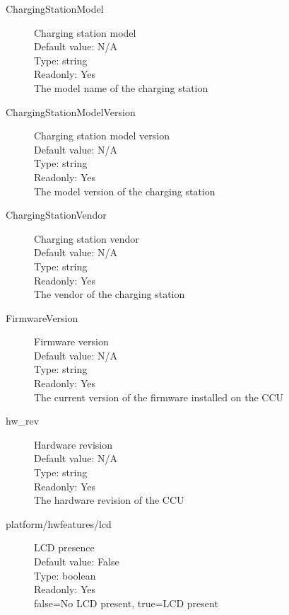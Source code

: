 \begin{description}
\item[ChargingStationModel] Charging station model\\
  Default value: N/A\\
  Type: string\\
  Readonly: Yes\\
  The model name of the charging station\\

\item[ChargingStationModelVersion] Charging station model version\\
  Default value: N/A\\
  Type: string\\
  Readonly: Yes\\
  The model version of the charging station\\

\item[ChargingStationVendor] Charging station vendor\\
  Default value: N/A\\
  Type: string\\
  Readonly: Yes\\
  The vendor of the charging station\\

\item[FirmwareVersion] Firmware version\\
  Default value: N/A\\
  Type: string\\
  Readonly: Yes\\
  The current version of the firmware installed on the CCU\\

\item[hw\_rev] Hardware revision\\
  Default value: N/A\\
  Type: string\\
  Readonly: Yes\\
  The hardware revision of the CCU\\

\item[platform/hwfeatures/lcd] LCD presence\\
  Default value: False\\
  Type: boolean\\
  Readonly: Yes\\
  false=No LCD present, true=LCD present\\


\end{description}

